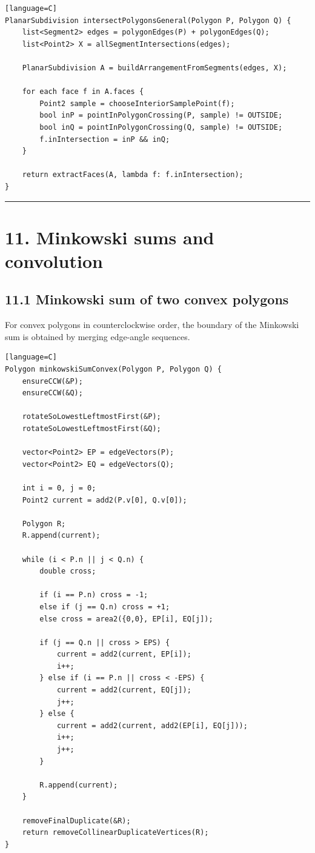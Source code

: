 \documentclass[11pt]{article}
\begin{document}
\begin{verbatim}[language=C]
PlanarSubdivision intersectPolygonsGeneral(Polygon P, Polygon Q) {
    list<Segment2> edges = polygonEdges(P) + polygonEdges(Q);
    list<Point2> X = allSegmentIntersections(edges);

    PlanarSubdivision A = buildArrangementFromSegments(edges, X);

    for each face f in A.faces {
        Point2 sample = chooseInteriorSamplePoint(f);
        bool inP = pointInPolygonCrossing(P, sample) != OUTSIDE;
        bool inQ = pointInPolygonCrossing(Q, sample) != OUTSIDE;
        f.inIntersection = inP && inQ;
    }

    return extractFaces(A, lambda f: f.inIntersection);
}
\end{verbatim}

\begin{center}\rule{0.5\linewidth}{0.5pt}\end{center}

\section{11. Minkowski sums and
convolution}\label{minkowski-sums-and-convolution}

\subsection{11.1 Minkowski sum of two convex
polygons}\label{minkowski-sum-of-two-convex-polygons}

For convex polygons in counterclockwise order, the boundary of the
Minkowski sum is obtained by merging edge-angle sequences.

\begin{verbatim}[language=C]
Polygon minkowskiSumConvex(Polygon P, Polygon Q) {
    ensureCCW(&P);
    ensureCCW(&Q);

    rotateSoLowestLeftmostFirst(&P);
    rotateSoLowestLeftmostFirst(&Q);

    vector<Point2> EP = edgeVectors(P);
    vector<Point2> EQ = edgeVectors(Q);

    int i = 0, j = 0;
    Point2 current = add2(P.v[0], Q.v[0]);

    Polygon R;
    R.append(current);

    while (i < P.n || j < Q.n) {
        double cross;

        if (i == P.n) cross = -1;
        else if (j == Q.n) cross = +1;
        else cross = area2({0,0}, EP[i], EQ[j]);

        if (j == Q.n || cross > EPS) {
            current = add2(current, EP[i]);
            i++;
        } else if (i == P.n || cross < -EPS) {
            current = add2(current, EQ[j]);
            j++;
        } else {
            current = add2(current, add2(EP[i], EQ[j]));
            i++;
            j++;
        }

        R.append(current);
    }

    removeFinalDuplicate(&R);
    return removeCollinearDuplicateVertices(R);
}
\end{verbatim}
\end{document}
